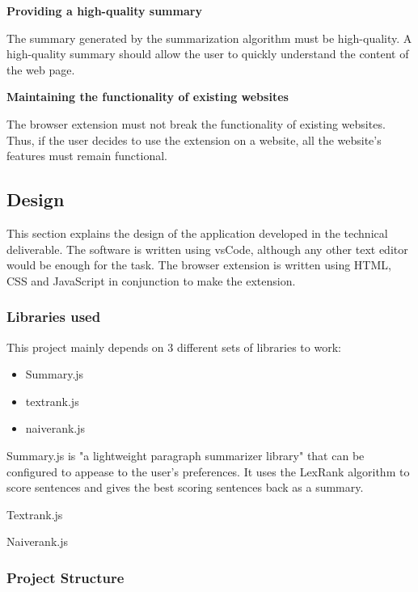 \documentclass[conference,compsoc]{IEEEtran}
\begin{document}
\vspace{0.4cm}
\textbf{Providing a high-quality summary}

The summary generated by the summarization algorithm must be high-quality.
A high-quality summary should allow the user to quickly understand the content of the web page.


\vspace{0.4cm}
\textbf{Maintaining the functionality of existing websites}

The browser extension must not break the functionality of existing websites.
Thus, if the user decides to use the extension on a website, all the website's features must remain functional. 



\subsection{Design}


This section explains the design of the application developed in the technical deliverable.
The software is written using vsCode, although any other text editor would be enough for the task.
The browser extension is written using HTML, CSS and JavaScript in conjunction to make the extension.

\subsubsection{Libraries used}
This project mainly depends on 3 different sets of libraries to work:
\begin{itemize}
  \item Summary.js
  \item textrank.js
  \item naiverank.js
\end{itemize}

Summary.js is "a lightweight paragraph summarizer library" that can be configured to appease to the user's preferences.
It uses the LexRank algorithm to score sentences and gives the best scoring sentences back as a summary.

Textrank.js


Naiverank.js


\subsubsection{Project Structure}
\end{document}
